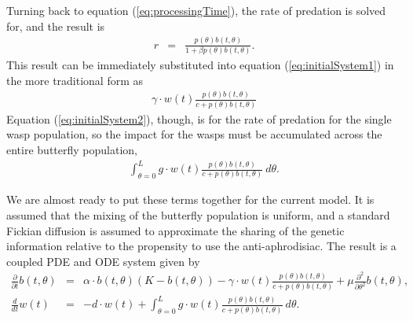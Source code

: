 \documentclass[12pt]{article}
\begin{document}
Turning back to equation (\ref{eq:processingTime}), the rate of
predation is solved for, and the result is
\begin{eqnarray}
  \label{eq:rateOfPredation}
  r & = &  \frac{p(\theta) b(t,\theta) }{1 + \beta p(\theta) b(t,\theta)}.
\end{eqnarray}
This result can be immediately substituted into equation
(\ref{eq:initialSystem1}) in the more traditional form as
\begin{eqnarray}
  \label{eq:butterflyPredationRate}
  \gamma \cdot w(t) \frac{p(\theta) b(t,\theta) }{c +  p(\theta) b(t,\theta)}
\end{eqnarray}
Equation (\ref{eq:initialSystem2}), though, is for the rate of predation
for the single wasp population, so the impact for the wasps must be
accumulated across the entire butterfly population,
\begin{eqnarray}
  \label{eq:waspPredationRate}
  \int^L_{\theta=0} g \cdot w(t) \frac{p(\theta) b(t,\theta) }{c + p(\theta) b(t,\theta)} ~ d\theta.
\end{eqnarray}

We are almost ready to put these terms together for the current
model. It is assumed that the mixing of the butterfly population is
uniform, and a standard Fickian diffusion is assumed to approximate
the sharing of the genetic information relative to the propensity to
use the anti-aphrodisiac. The result is a coupled PDE and ODE system
given by 
\begin{eqnarray}
  \label{eq:odePDE1}
  \frac{\partial}{\partial t} b(t,\theta) & = &
      \alpha \cdot b(t,\theta) (K - b(t,\theta))
      - \gamma \cdot w(t) \frac{p(\theta) b(t,\theta)}{c+p(\theta)b(t,\theta)}
      + \mu \frac{\partial^2}{\partial \theta^2} b(t,\theta) , \\
  \label{eq:odePDE2}
  \frac{d}{dt} w(t) & = & -d \cdot w(t) +
      \int^L_{\theta=0} g \cdot w(t) \frac{p(\theta) b(t,\theta) }{c + p(\theta) b(t,\theta)} ~ d\theta.
\end{eqnarray}
\end{document}
